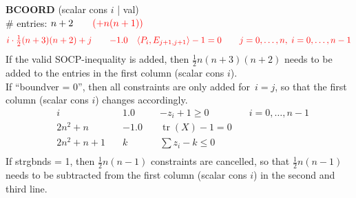 \documentclass[11pt,a4paper]{article}
\DeclareMathOperator{\tr}{tr}
\theoremstyle{definition}
\begin{document}
{\textbf{BCOORD} (scalar cons $i$ | val) \\
\# entries: $n+2 \qquad {\color{red} (+n(n+1))}$ \\
\[
\begin{aligned}
  &{\color{red}i\cdot\tfrac{1}{2}(n+3)(n+2) + j} \quad & {\color{red}-1.0}
  \quad & {\color{red} \langle P_i, E_{j+1,j+1} \rangle - 1 = 0} \quad & {\color{red} j
  = 0,\dots,n,\; i = 0,\dots,n-1} \\
  \end{aligned}
\]
{\color{red} If the valid SOCP-inequality is added, then $\tfrac{1}{2}n(n+3)(n+2)$ needs
  to be added to the entries in the first column (scalar cons $i$).}\\
{\color{violet} If ``boundver = 0'', then all constraints are only added
  for~$i=j$, so that the first column (scalar cons $i$) changes accordingly.}\\
\[
  \begin{aligned}
    &i \quad & 1.0 \quad & -z_i + 1 \geq 0 \quad & i = 0,\dots,n-1 \\
    &2n^2+n \quad & -1.0 \quad & \tr(X) -1 = 0 \quad & \\
    &2n^2+n+1 \quad & k \quad & \sum z_i - k \leq 0 \quad & \\
  \end{aligned}
\]
\noindent
{\color{blue} If strgbnds = 1, then $\tfrac{1}{2}n(n-1)$ constraints are
  cancelled, so that $\tfrac{1}{2}n(n-1)$ needs to be subtracted from the
  first column (scalar cons $i$) in the second and third line.\\
}
}
\end{document}
